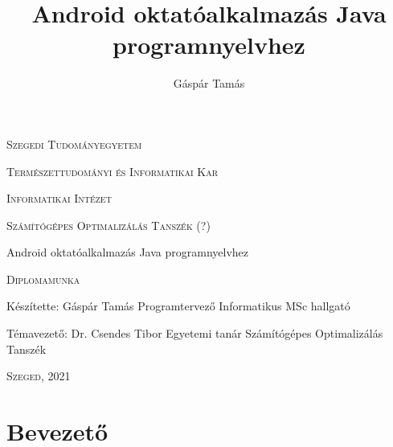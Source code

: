 \documentclass[12pt,a4paper]{article}
\title{Android oktatóalkalmazás Java programnyelvhez}
\author{Gáspár Tamás}
\begin{document}
	
	
	\thispagestyle{empty}
	\centerline{\textsc{\Large{Szegedi Tudományegyetem}}}
	\vspace{0.3 cm}
	\centerline{\textsc{\Large{Természettudományi és Informatikai Kar}}}
	
	\vspace*{2 cm}
	
	\centerline{\textsc{\Large{Informatikai Intézet}}}
	\vspace{0.3 cm}
	\centerline{\textsc{\Large{Számítógépes Optimalizálás Tanszék (?)}}}
	
	\vspace{3 cm}
	
	\centerline{\LARGE{Android oktatóalkalmazás Java programnyelvhez}}
	\vspace{0.5 cm}
	\centerline{\Large{\textsc{Diplomamunka}}}
	
	\vspace{3 cm}
	
	\begin{flushleft}
		Készítette: Gáspár Tamás \newline
		Programtervező Informatikus MSc hallgató
	\end{flushleft}

	\vspace{1 cm}

	\begin{flushright}
		\hspace*{\fill} Témavezető: Dr. Csendes Tibor \newline
		\hspace*{\fill} Egyetemi tanár \newline
		\hspace*{\fill} Számítógépes Optimalizálás Tanszék 
	\end{flushright}
	
	\vspace{3 cm}
	
	\centerline{\Large{\textsc{Szeged, 2021}}}
	
	\newpage
	\thispagestyle{empty}
	
	\tableofcontents
	
	\newpage
	\setcounter{page}{1}
	\fontsize{12}{16}\selectfont
	
	\section{Bevezető}
\end{document}

